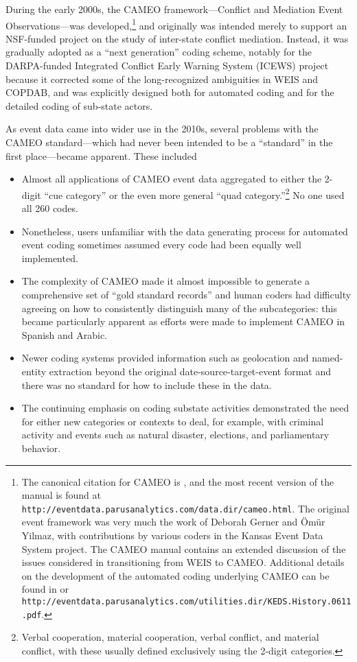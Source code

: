 \documentclass[11pt]{report}
\newcommand{\fn}[1]{\footnote{#1}}
\begin{document}
During the early 2000s, the CAMEO framework---Conflict and Mediation Event Observations---was developed,\footnote{The canonical citation for CAMEO is \cite{SGY09}, and the most recent version of the manual is found at \texttt{http://eventdata.parusanalytics.com/data.dir/cameo.html}.  The original event framework was very much the work of Deborah Gerner and \"Om\"ur Yilmaz, with contributions by various coders in the Kansas Event Data System project. The CAMEO manual contains an extended discussion of the issues considered in transitioning from WEIS to CAMEO. Additional details on the development of the automated coding underlying CAMEO can be found in \cite{Schrodt06TPM} or \texttt{http://eventdata.parusanalytics.com/utilities.dir/KEDS.History.0611.pdf}. } and originally was intended merely to support an NSF-funded project on the study of inter-state conflict mediation. Instead, it was gradually adopted as a ``next generation'' coding scheme, notably for the DARPA-funded Integrated Conflict Early Warning System (ICEWS) project \citep{OBrien10} because it corrected some of the long-recognized ambiguities in WEIS and COPDAB, and was explicitly designed both for automated coding and for the detailed coding of sub-state actors. 

As event data came into wider use in the 2010s, several problems with the CAMEO standard---which had never been intended to be a ``standard'' in the first place---became apparent. These included

\begin{itemize}
\item Almost all applications of CAMEO event data aggregated to either the 2-digit ``cue category'' or the even more general ``quad category.''\fn{Verbal cooperation, material cooperation, verbal conflict, and material conflict, with these usually defined exclusively using the 2-digit categories.} No one used all 260 codes.
\item Nonetheless, users unfamiliar with the data generating process for automated event coding sometimes assumed every code had been equally well implemented.
\item The complexity of CAMEO made it almost impossible to generate a comprehensive set of ``gold standard records'' and human coders had difficulty agreeing on how to consistently distinguish many of the subcategories: this became particularly apparent as efforts were made to implement CAMEO in Spanish and Arabic.
\item Newer coding systems provided information such as geolocation and named-entity extraction beyond the original date-source-target-event format and there was no standard for how to include these in the data.
\item The continuing emphasis on coding substate activities demonstrated the need for either new categories or contexts to deal, for example, with criminal activity and events such as natural disaster, elections, and parliamentary behavior.
\end{itemize}
\end{document}
